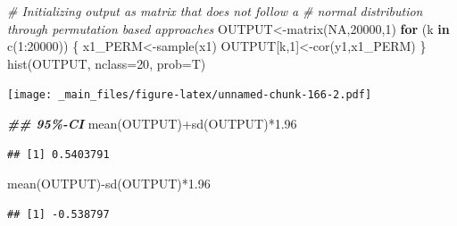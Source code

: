 \documentclass[
  notitlepage,
  onecolumn,
  openany]{book}
\newenvironment{Shaded}{\begin{snugshade}}{\end{snugshade}}
\newcommand{\AttributeTok}[1]{\textcolor[rgb]{0.77,0.63,0.00}{#1}}
\newcommand{\CommentTok}[1]{\textcolor[rgb]{0.56,0.35,0.01}{\textit{#1}}}
\newcommand{\ConstantTok}[1]{\textcolor[rgb]{0.00,0.00,0.00}{#1}}
\newcommand{\ControlFlowTok}[1]{\textcolor[rgb]{0.13,0.29,0.53}{\textbf{#1}}}
\newcommand{\DecValTok}[1]{\textcolor[rgb]{0.00,0.00,0.81}{#1}}
\newcommand{\DocumentationTok}[1]{\textcolor[rgb]{0.56,0.35,0.01}{\textbf{\textit{#1}}}}
\newcommand{\FloatTok}[1]{\textcolor[rgb]{0.00,0.00,0.81}{#1}}
\newcommand{\FunctionTok}[1]{\textcolor[rgb]{0.00,0.00,0.00}{#1}}
\newcommand{\NormalTok}[1]{#1}
\newcommand{\OtherTok}[1]{\textcolor[rgb]{0.56,0.35,0.01}{#1}}
\newcommand{\SpecialCharTok}[1]{\textcolor[rgb]{0.00,0.00,0.00}{#1}}
\begin{document}
\begin{Shaded}
\begin{Highlighting}[]
\CommentTok{\# Initializing output as matrix that does not follow a }
\CommentTok{\# normal distribution through permutation based approaches}
\NormalTok{OUTPUT}\OtherTok{\textless{}{-}}\FunctionTok{matrix}\NormalTok{(}\ConstantTok{NA}\NormalTok{,}\DecValTok{20000}\NormalTok{,}\DecValTok{1}\NormalTok{)}
\ControlFlowTok{for}\NormalTok{ (k }\ControlFlowTok{in} \FunctionTok{c}\NormalTok{(}\DecValTok{1}\SpecialCharTok{:}\DecValTok{20000}\NormalTok{))}
\NormalTok{\{}
\NormalTok{  x1\_PERM}\OtherTok{\textless{}{-}}\FunctionTok{sample}\NormalTok{(x1)}
\NormalTok{  OUTPUT[k,}\DecValTok{1}\NormalTok{]}\OtherTok{\textless{}{-}}\FunctionTok{cor}\NormalTok{(y1,x1\_PERM)}
\NormalTok{\}}
\FunctionTok{hist}\NormalTok{(OUTPUT, }\AttributeTok{nclass=}\DecValTok{20}\NormalTok{, }\AttributeTok{prob=}\NormalTok{T)}
\end{Highlighting}
\end{Shaded}

\texttt{[image: \_main\_files/figure-latex/unnamed-chunk-166-2.pdf]}

\begin{Shaded}
\begin{Highlighting}[]
\DocumentationTok{\#\# 95\%{-}CI}
\FunctionTok{mean}\NormalTok{(OUTPUT)}\SpecialCharTok{+}\FunctionTok{sd}\NormalTok{(OUTPUT)}\SpecialCharTok{*}\FloatTok{1.96}
\end{Highlighting}
\end{Shaded}

\begin{verbatim}
## [1] 0.5403791
\end{verbatim}

\begin{Shaded}
\begin{Highlighting}[]
\FunctionTok{mean}\NormalTok{(OUTPUT)}\SpecialCharTok{{-}}\FunctionTok{sd}\NormalTok{(OUTPUT)}\SpecialCharTok{*}\FloatTok{1.96}
\end{Highlighting}
\end{Shaded}

\begin{verbatim}
## [1] -0.538797
\end{verbatim}
\end{document}
